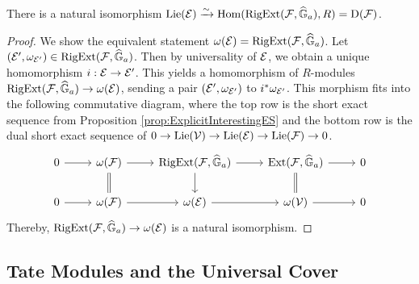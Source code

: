 \documentclass[../main.tex]{subfiles}
\begin{document}
\begin{lem}\label{lem:LieAlgOfUnivAddExt}
  There is a natural isomorphism $\operatorname{Lie}(\mathcal{E}) \xrightarrow{\sim} \operatorname{Hom}(\operatorname {RigExt}(\mathcal{F}, \widehat{\mathbb{G}}_a), R) 
  = \mathrm{D}(\mathcal{F})$.
\begin{proof}
  We show the equivalent statement $\omega(\mathcal{E}) = \operatorname {RigExt}(\mathcal{F}, \widehat{\mathbb{G}}_a)$. 
  Let $(\mathcal{E}', \omega_{\mathcal{E}'}) \in \operatorname {RigExt}(\mathcal{F}, \widehat{\mathbb{G}}_a)$. Then by universality of 
  $\mathcal{E}$, we obtain a unique homomorphism $i: \mathcal{E} \to \mathcal{E}'$. This yields a 
  homomorphism of $R$-modules $\operatorname {RigExt}(\mathcal{F}, \widehat{\mathbb{G}}_a) \to \omega(\mathcal{E})$, 
  sending a pair $(\mathcal{E}', \omega_{\mathcal{E}'})$ to $i^*\omega_{\mathcal{E}'}$. This morphism
  fits into the following commutative diagram, where the top row is 
  the short exact sequence from Proposition \ref{prop:ExplicitInterestingES}
  and the bottom row is the dual short exact sequence of 
  $0 \to \operatorname{Lie}(\mathcal{V}) \to \operatorname{Lie}(\mathcal{E}) \to \operatorname{Lie}(\mathcal{F}) \to 0$.
  \begin{equation*}
  \begin{tikzcd}[ampersand replacement=\&]
  	0 \& {\omega(\cF)} \& {\RigExt(\cF, \Ghat_a)} \& {\Ext(\cF, \Ghat_a)} \& 0 \\
  	0 \& {\omega(\cF)} \& {\omega(\cE)} \& {\omega(\cV)} \& 0
  	\arrow[from=1-1, to=1-2]
  	\arrow[from=1-2, to=1-3]
  	\arrow[Rightarrow, no head, from=1-2, to=2-2]
  	\arrow[from=1-3, to=1-4]
  	\arrow[from=1-3, to=2-3]
  	\arrow[from=1-4, to=1-5]
  	\arrow[Rightarrow, no head, from=1-4, to=2-4]
  	\arrow[from=2-1, to=2-2]
  	\arrow[from=2-2, to=2-3]
  	\arrow[from=2-3, to=2-4]
  	\arrow[from=2-4, to=2-5]
  \end{tikzcd}
  \end{equation*}
  Thereby, $\operatorname {RigExt}(\mathcal{F}, \widehat{\mathbb{G}}_a) \to \omega(\mathcal{E})$ is a natural isomorphism.
\end{proof}
\end{lem}

\subsection{Tate Modules and the Universal Cover} %
\label{sub:Tate Modules and the Universal Cover}
\end{document}
